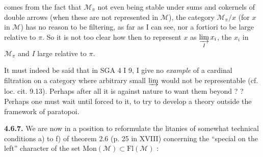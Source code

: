 \documentclass[11pt]{article}
\newcommand{\printedpage}[1]{\marginpar{\footnotesize p.~#1}}
\newcommand{\msp}[1]{\marginpar{\footnotesize [#1]}}
\newcommand{\Mc}{\mathcal{M}}
\begin{document}
\msp{page 156}

comes from the fact that $\Mc_{\pi}$ not even being stable under sums and cokernels of double arrows (when these are not represented in $\Mc$), the category $\Mc_{\pi}/x$ (for $x$ in $\Mc$) has no reason to be filtering, as far as I can see, nor a fortiori
\printedpage{51}
to be large relative to $\pi$. So it is not too clear how then to represent $x$ as $\varinjlim\limits_{I} x_i$, the $x_i$ in $\Mc_{\pi}$ and $I$ large relative to $\pi$.

It must indeed be said that in SGA 4 I 9, I give no \textit{example} of a cardinal filtration on a category where arbitrary small $\varinjlim$ would not be representable (cf. loc. cit. 9.13). Perhaps after all it is against nature to want them beyond ? ? Perhaps one must wait until forced to it, to try to develop a theory outside the framework of paratopoi.

\msp{page 157}

\textbf{4.6.7.} We are now in a position to reformulate the litanies of somewhat technical conditions a) to f) of theorem 2.6 (p. 25 in XVIII) concerning the ``special on the left'' character of the set $\mathrm{Mon}(\Mc) \subset \mathrm{Fl}(\Mc)$ :
\end{document}

